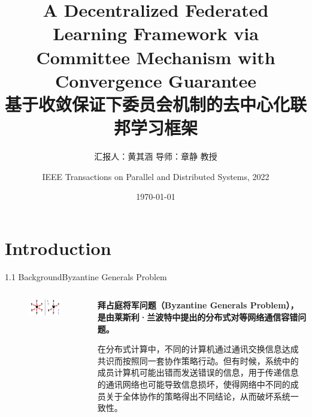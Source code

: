 \documentclass{sintefbeamer}
\title{A Decentralized Federated Learning Framework via Committee Mechanism with Convergence Guarantee\\基于收敛保证下委员会机制的去中心化联邦学习框架}
\subtitle{汇报人：黄其涵 \qquad 导师：章静 教授 \qquad }
\author{IEEE Transactions on Parallel and Distributed Systems, 2022}
\date{\today}
\theoremstyle{definition}
\begin{document}
\maketitle


\section{Introduction}{}

\begin{frame}{1.1 Background}{Byzantine Generals Problem}
\begin{columns}
\begin{column}{0.35\textwidth}
\begin{figure}[ht]
\centering
\includegraphics[width=1\textwidth]{images/Byzantine_Generals}
\end{figure}
\end{column}
\begin{column}{0.65\textwidth}
\textbf{拜占庭将军问题（Byzantine Generals Problem），是由莱斯利·兰波特中提出的分布式对等网络通信容错问题。}

在分布式计算中，不同的计算机通过通讯交换信息达成共识而按照同一套协作策略行动。但有时候，系统中的成员计算机可能出错而发送错误的信息，用于传递信息的通讯网络也可能导致信息损坏，使得网络中不同的成员关于全体协作的策略得出不同结论，从而破坏系统一致性。

\end{column}
\end{columns}
\end{frame}
\end{document}
